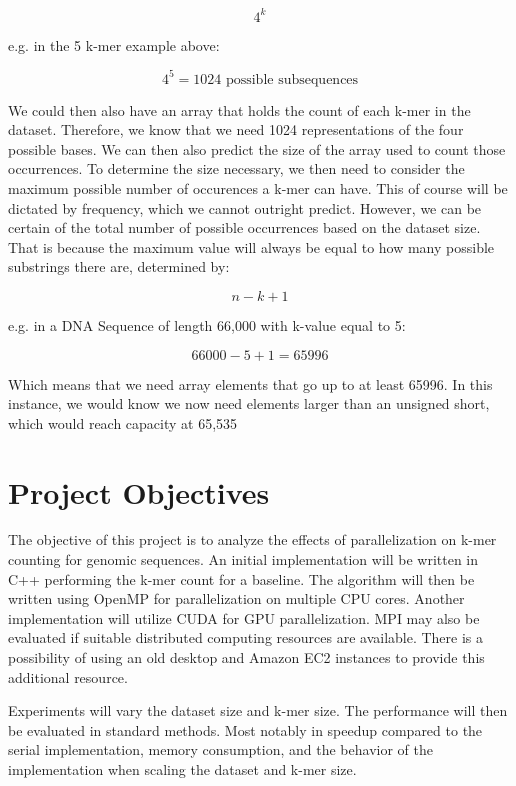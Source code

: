 \documentclass{article}
\begin{document}
\[
4^k
\]

e.g. in the 5 k-mer example above:

\[
4^5 = 1024 \text{ possible subsequences}
\]

We could then also have an array that holds the count of each k-mer in the dataset. Therefore, we know that we  
need 1024 representations of the four possible bases. We can then also predict the size of the array used to count those  
occurrences. To determine the size necessary, we then need to consider the maximum possible number of occurences  
a k-mer can have. This of course will be dictated by frequency, which we cannot outright predict. However, we  
can be certain of the total number of possible occurrences based on the dataset size. That is because the maximum  
value will always be equal to how many possible substrings there are, determined by:

\[
n - k + 1
\]

e.g. in a DNA Sequence of length 66,000 with k-value equal to 5:

\[
66000 - 5 + 1 = 65996
\]

Which means that we need array elements that go up to at least 65996. In this instance, we would know we now need  
elements larger than an unsigned short, which would reach capacity at 65,535

\section{Project Objectives}

The objective of this project is to analyze the effects of parallelization on k-mer counting for genomic sequences.  
An initial implementation will be written in C++ performing the k-mer count for a baseline. The algorithm will then  
be written using OpenMP for parallelization on multiple CPU cores. Another implementation will utilize CUDA  
for GPU parallelization. MPI may also be evaluated if suitable distributed computing resources are available.  
There is a possibility of using an old desktop and Amazon EC2 instances to provide this additional resource. 
  
Experiments will vary the dataset size and k-mer size. The performance will then be evaluated in standard methods. Most  
notably in speedup compared to the serial implementation, memory consumption, and the behavior of the implementation when scaling  
the dataset and k-mer size. 


\newpage



\end{document}
